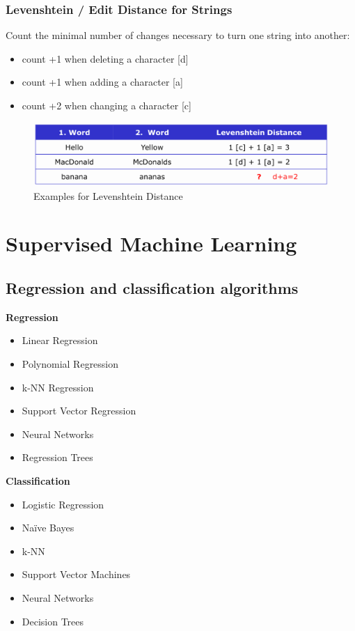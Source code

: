 \documentclass[11pt]{article}
\begin{document}
\subsubsection{Levenshtein / Edit Distance for Strings}

Count the minimal number of changes necessary to turn one string into another:
\begin{itemize}
    \item count +1 when deleting a character [d]
    \item count +1 when adding a character [a]
    \item count +2 when changing a character [c]
\end{itemize}

\begin{figure}[htb!]
    \centering
    \includegraphics[keepaspectratio=true, width=\linewidth]{levenshtein.png}
    \caption{Examples for Levenshtein Distance}
    \label{fig:levenshtein}
\end{figure}

\newpage

\section{Supervised Machine Learning}

\subsection{Regression and classification algorithms}

\begin{multicols}{2}
    \textbf{Regression}
    \begin{itemize}
        \item Linear Regression
        \item Polynomial Regression
        \item k-NN Regression
        \item Support Vector Regression
        \item Neural Networks
        \item Regression Trees
    \end{itemize}
    \columnbreak
    \textbf{Classification}
    \begin{itemize}
        \item Logistic Regression
        \item Naïve Bayes
        \item k-NN
        \item Support Vector Machines
        \item Neural Networks
        \item Decision Trees
    \end{itemize}
\end{multicols}
\end{document}
